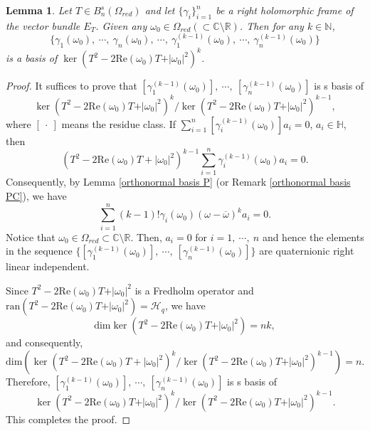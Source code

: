 \documentclass[pdflatex,sn-mathphys-num]{sn-jnl}%
\theoremstyle{thmstyleone}%
\theoremstyle{thmstyletwo}%
\theoremstyle{thmstylethree}%
\newtheorem{lemma}{Lemma}%
\newtheorem{lemma}[theorem]{Lemma}
\theoremstyle{definition}
\theoremstyle{remark}
\begin{document}
\begin{lemma}\label{Basis}
Let $T\in B_n^{s}(\Omega_{red})$ and let $\{\gamma_i\}_{i=1}^{n}$ be a right holomorphic frame of the vector bundle $E_T$. Given any $\omega_0\in\Omega_{red}(\subset \mathbb{C}\setminus\mathbb{R})$. Then for any $k\in\mathbb{N}$,
\[
\{\gamma_1(\omega_0),\ \cdots,\ \gamma_n(\omega_0),\ \cdots,\ \gamma_1^{(k-1)}(\omega_0),\ \cdots,\ \gamma_n^{(k-1)}(\omega_0)\}
\]
is a basis of $\ker(T^2-2\mathrm{Re}(\omega_0)T+\vert\omega_0\vert^2)^k$.
\end{lemma}
    \begin{proof}
    It suffices to prove that $[{{\gamma_1^{(k-1)}(\omega_0)}}],\ \cdots,\ [{\gamma_n^{(k-1)}(\omega_0)}]$
    is s basis of
    \[
    \ker(T^2-2\mathrm{Re}(\omega_0)T+\vert\omega_0\vert^2)^k\slash\ker(T^2-2\mathrm{Re}(\omega_0)T+\vert\omega_0\vert^2)^{k-1},
    \]
    where $[\ \cdot\ ]$ means the
    residue class. If $\sum_{i=1}^n[\gamma_i^{(k-1)}(\omega_0)]a_i=0$, $a_i\in\mathbb{H}$, then
    \[
    (T^2-2\mathrm{Re}(\omega_0)T+|\omega_0|^2)^{k-1}\sum_{i=1}^n\gamma_i^{(k-1)}(\omega_0)a_i=0.
    \]
    Consequently, by Lemma \ref{orthonormal basis P} (or Remark \ref{orthonormal basis PC}), we have
    \[
   \sum_{i=1}^n(k-1)!\gamma_i(\omega_0)(\omega-\overline{\omega})^ka_i=0.
    \]
    Notice that $\omega_0\in\Omega_{red}\subset \mathbb{C}\setminus\mathbb{R}$.
    Then, $a_i=0$ for $i=1,\ \cdots,\ n$ and hence the elements in the sequence $\{[{{\gamma_1^{(k-1)}(\omega_0)}}],\ \cdots,\ [{\gamma_n^{(k-1)}(\omega_0)}]\}$
    are quaternionic right linear independent.

    Since $T^2-2\mathrm{Re}(\omega_0)T+\vert\omega_0\vert^2$ is a Fredholm operator and $\mathrm{ran}(T^2-2\mathrm{Re}(\omega_0)T+\vert\omega_0\vert^2)=\mathcal{H}_q$,
    we have
    \[
    \mathrm{dim}\ker(T^2-2\mathrm{Re}(\omega_0)T+\vert\omega_0\vert^2)=nk,
    \]
    and consequently,
    \[
    \mathrm{dim}(\ker(T^2-2\mathrm{Re}(\omega_0)T+|\omega_0|^2)^k\slash\ker(T^2-2\mathrm{Re}(\omega_0)T+\vert\omega_0\vert^2)^{k-1})=n.
    \]
    Therefore, $[{{\gamma_1^{(k-1)}(\omega_0)}}],\ \cdots,\ [{\gamma_n^{(k-1)}(\omega_0)}]$
    is s basis of
    \[
    \ker(T^2-2\mathrm{Re}(\omega_0)T+\vert\omega_0\vert^2)^k\slash\ker(T^2-2\mathrm{Re}(\omega_0)T+\vert\omega_0\vert^2)^{k-1}.
    \]
    This completes the proof.
    \end{proof}
\end{document}
